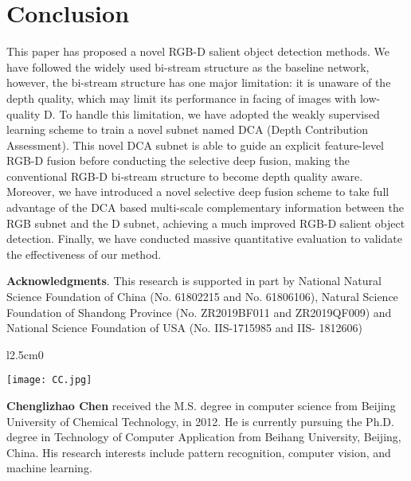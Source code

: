 \documentclass[journal]{IEEEtran}
\begin{document}
\section{Conclusion}
This paper has proposed a novel RGB-D salient object detection methods.
We have followed the widely used bi-stream structure as the baseline network, however, the bi-stream structure has one major limitation: it is unaware of the depth quality, which may limit its performance in facing of images with low-quality D.
To handle this limitation, we have adopted the weakly supervised learning scheme to train a novel subnet named DCA (Depth Contribution Assessment).
This novel DCA subnet is able to guide an explicit feature-level RGB-D fusion before conducting the selective deep fusion, making the conventional RGB-D bi-stream structure to become depth quality aware.
Moreover, we have introduced a novel selective deep fusion scheme to take full advantage of the DCA based multi-scale complementary information between the RGB subnet and the D subnet, achieving a much improved RGB-D salient object detection.
Finally, we have conducted massive quantitative evaluation to validate the effectiveness of our method.

\textbf{Acknowledgments}. This research is supported in part by
National Natural Science Foundation of China (No. 61802215
and No. 61806106), Natural Science Foundation of Shandong
Province (No. ZR2019BF011 and ZR2019QF009) and National Science Foundation of USA (No. IIS-1715985 and IIS-
1812606)



















\iffalse

\begin{wrapfigure}[9]{l}{2.5cm}{0}
\vspace{-0.6cm}
\graphicspath{{author/}}
\texttt{[image: CC.jpg]}\\
\end{wrapfigure}
\vspace{0.2cm}
\textbf{Chenglizhao Chen} received the M.S. degree in computer science from Beijing University of Chemical Technology, in 2012. He is currently pursuing the Ph.D. degree in Technology of Computer Application from Beihang University, Beijing, China. His research interests include pattern recognition, computer vision, and machine learning.\\
\end{document}
